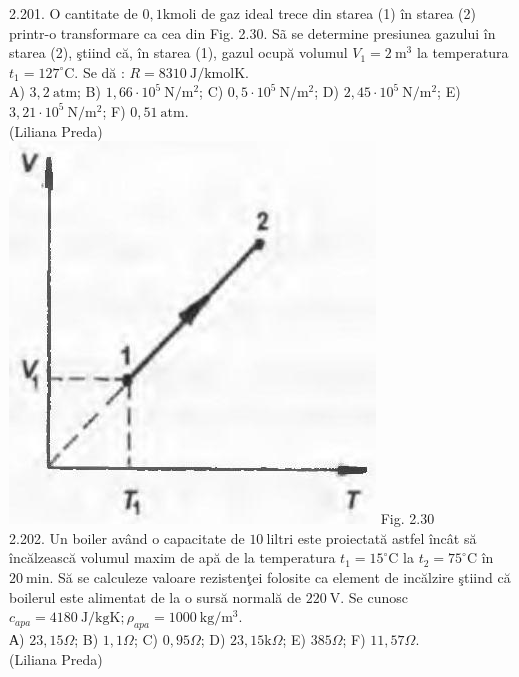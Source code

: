 \documentclass[10pt]{article}
\begin{document}
2.201. O cantitate de $0,1 \mathrm{kmoli}$ de gaz ideal trece din starea (1) în starea (2) printr-o transformare ca cea din Fig. 2.30. Sã se determine presiunea gazului în starea (2), ştiind că, în starea (1), gazul ocupă volumul $V_{1}=2 \mathrm{~m}^{3}$ la temperatura ${t}_{1}=127^{\circ} \mathrm{C}$. Se dă : $R=8310 \mathrm{~J} / \mathrm{kmolK}$.\\ A) $3,2 \mathrm{~atm}$; B) $1,66 \cdot 10^{5} \mathrm{~N} / \mathrm{m}^{2}$; C) $0,5 \cdot 10^{5} \mathrm{~N} / \mathrm{m}^{2}$; D) $2,45 \cdot 10^{5} \mathrm{~N} / \mathrm{m}^{2}$; E) $3,21 \cdot 10^{5} \mathrm{~N} / \mathrm{m}^{2}$; F) $0,51 \mathrm{~atm}$.\\ (Liliana Preda)\\ \includegraphics[max width=\textwidth, center]{2025_07_01_5b3ff9fa0d508c8e9f17g-119} Fig. 2.30\\

2.202. Un boiler având o capacitate de $10 \mathrm{~liltri}$ este proiectată astfel încât să încălzească volumul maxim de apă de la temperatura $t_{1}=15^{\circ} \mathrm{C}$ la $t_{2}=75^{\circ} \mathrm{C}$ în $20 \mathrm{~min}$. Să se calculeze valoare rezistenţei folosite ca element de incălzire ştiind că boilerul este alimentat de la o sursă normală de $220 \mathrm{~V}$. Se cunosc $c_{a p a}=4180 \mathrm{~J} / \mathrm{kgK} ; \rho_{a p a}=1000 \mathrm{~kg} / \mathrm{m}^{3}$.\\ А) $23,15 \Omega$; B) $1,1 \Omega$; C) $0,95 \Omega$; D) $23,15 \mathrm{k} \Omega$; E) $385 \Omega$; F) $11,57 \Omega$.\\ (Liliana Preda)\\
\end{document}
